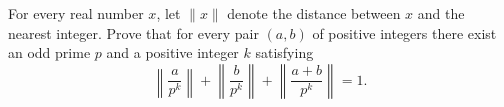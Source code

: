 For every real number $x$, let $\|x\|$ denote the distance between $x$ and the nearest integer. Prove that for every pair $(a, b)$ of positive integers there exist an odd prime $p$ and a positive integer $k$ satisfying
\[ \left\| \frac{a}{p^k} \right\| + \left\| \frac{b}{p^k} \right\| + \left\| \frac{a+b}{p^k} \right\| = 1. \]
